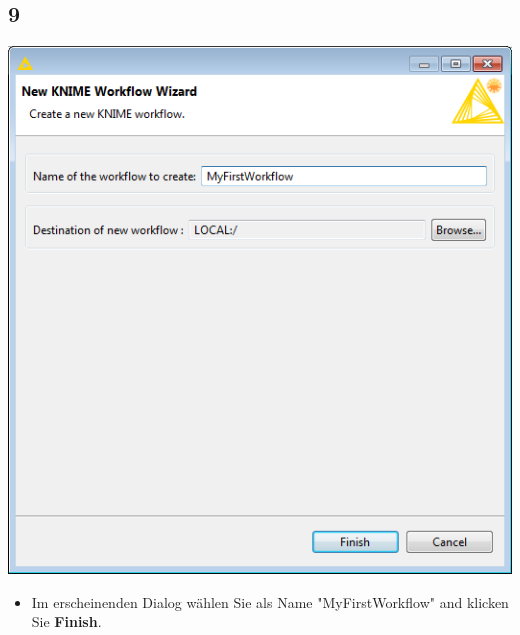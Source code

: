 \documentclass{beamer}
\begin{document}
\subsection{9}
\begin{frame}
	\begin{center}
  		\includegraphics[height=0.6\textheight]{9.png}
	\end{center}
	\begin{itemize}
		\item Im erscheinenden Dialog wählen Sie als Name "MyFirstWorkflow" and klicken Sie \textbf{Finish}.		
	\end{itemize}
\end{frame}
\end{document}
